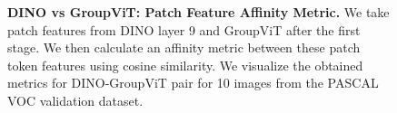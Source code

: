 \begin{figure}[thp]
\caption[\textbf{DINO vs GroupViT: Patch Feature Affinity Metric}]{\textbf{DINO vs GroupViT: Patch Feature Affinity Metric.} We take patch features from DINO layer 9 and GroupViT after the first stage. We then calculate an affinity metric between these patch token features using cosine similarity. We visualize the obtained metrics for DINO-GroupViT pair for 10 images from the PASCAL VOC validation dataset.}

  \label{fig:dinovsgroupvit}
\end{figure}

